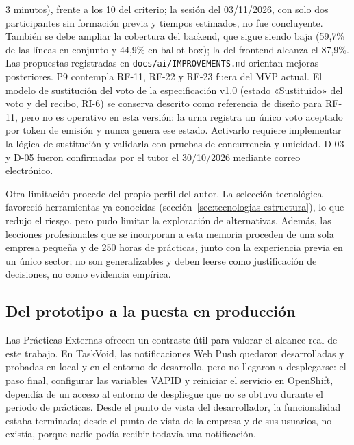 3 minutos), frente a los 10 del criterio; la sesión del 03/11/2026, con solo
dos participantes sin formación previa y tiempos estimados, no fue
concluyente. También se debe ampliar la cobertura del backend, que sigue
siendo baja (59,7\% de las líneas en conjunto y 44,9\% en ballot-box); la del
frontend alcanza el 87,9\%.
Las propuestas registradas en \texttt{docs/ai/IMPROVEMENTS.md} orientan
mejoras posteriores. P9 contempla RF-11, RF-22 y RF-23 fuera del MVP actual.
El modelo de sustitución del voto de la especificación v1.0 (estado
«Sustituido» del voto y del recibo, RI-6) se conserva descrito como referencia
de diseño para RF-11, pero no es operativo en esta versión: la urna registra un
único voto aceptado por token de emisión y nunca genera ese estado. Activarlo
requiere implementar la lógica de sustitución y validarla con pruebas de
concurrencia y unicidad.
D-03 y D-05 fueron confirmadas por el tutor el 30/10/2026 mediante correo
electrónico.

Otra limitación procede del propio perfil del autor. La selección
tecnológica favoreció herramientas ya conocidas
(sección~\ref{sec:tecnologias-estructura}), lo que redujo el riesgo, pero pudo
limitar la exploración de alternativas. Además, las lecciones profesionales
que se incorporan a esta memoria proceden de una sola empresa pequeña y de 250
horas de prácticas, junto con la experiencia previa en un único sector; no son
generalizables y deben leerse como justificación de decisiones, no como
evidencia empírica.

\subsection{Del prototipo a la puesta en producción}
\label{subsec:prototipo-produccion}
Las Prácticas Externas ofrecen un contraste útil para valorar el alcance real
de este trabajo. En TaskVoid, las notificaciones Web Push quedaron
desarrolladas y probadas en local y en el entorno de desarrollo, pero no
llegaron a desplegarse: el paso final, configurar las variables VAPID y
reiniciar el servicio en OpenShift, dependía de un acceso al entorno de
despliegue que no se obtuvo durante el periodo de prácticas. Desde el punto de
vista del desarrollador, la funcionalidad estaba terminada; desde el punto de
vista de la empresa y de sus usuarios, no existía, porque nadie podía recibir
todavía una notificación.

